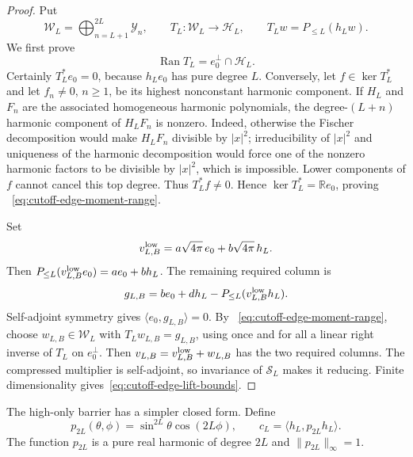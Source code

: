 \documentclass[11pt]{article}
\theoremstyle{definition}
\theoremstyle{remark}
\begin{document}
\begin{proof}
Put
\begin{equation}
 \mathcal W_L=\bigoplus_{n=L+1}^{2L}\mathcal Y_n,
 \qquad
 T_L:\mathcal W_L\longrightarrow\mathcal H_L,
 \qquad T_Lw=P_{\leq L}(h_Lw).
 \label{eq:cutoff-edge-moment-map}
\end{equation}
We first prove
\begin{equation}
 \operatorname{Ran}T_L=e_0^\perp\cap\mathcal H_L.
 \label{eq:cutoff-edge-moment-range}
\end{equation}
Certainly $T_L^*e_0=0$, because $h_Le_0$ has pure degree $L$.  Conversely,
let $f\in\ker T_L^*$ and let $f_n\neq0$, $n\geq1$, be its highest nonconstant
harmonic component.  If $H_L$ and $F_n$ are the associated homogeneous
harmonic polynomials, the degree-$(L+n)$ harmonic component of $H_LF_n$ is
nonzero.  Indeed, otherwise the Fischer decomposition would make $H_LF_n$
divisible by $|x|^2$; irreducibility of $|x|^2$ and uniqueness of the harmonic
decomposition would force one of the nonzero harmonic factors to be divisible
by $|x|^2$, which is impossible.  Lower components of $f$ cannot cancel this
top degree.  Thus $T_L^*f\neq0$.  Hence $\ker T_L^*=\mathbb Re_0$, proving
~\eqref{eq:cutoff-edge-moment-range}.

Set
\begin{equation}
 v^{\rm low}_{L,B}=a\sqrt{4\pi}\,e_0+b\sqrt{4\pi}\,h_L.
\end{equation}
Then
$P_{\leq L}(v^{\rm low}_{L,B}e_0)=ae_0+bh_L$.  The remaining required column
is
\begin{equation}
 g_{L,B}=be_0+dh_L-P_{\leq L}(v^{\rm low}_{L,B}h_L).
 \label{eq:cutoff-edge-compatible-rhs}
\end{equation}
Self-adjoint symmetry gives $\langle e_0,g_{L,B}\rangle=0$.  By
~\eqref{eq:cutoff-edge-moment-range}, choose $w_{L,B}\in\mathcal W_L$ with
$T_Lw_{L,B}=g_{L,B}$, using once and for all a linear right inverse of $T_L$
on $e_0^\perp$.  Then
$v_{L,B}=v^{\rm low}_{L,B}+w_{L,B}$ has the two required columns.  The
compressed multiplier is self-adjoint, so invariance of $\mathcal S_L$ makes
it reducing.  Finite dimensionality gives~\eqref{eq:cutoff-edge-lift-bounds}.
\end{proof}

The high-only barrier has a simpler closed form.  Define
\begin{equation}
 p_{2L}(\theta,\phi)=\sin^{2L}\theta\cos(2L\phi),
 \qquad
 c_L=\langle h_L,p_{2L}h_L\rangle.
 \label{eq:cutoff-edge-barrier-harmonic}
\end{equation}
The function $p_{2L}$ is a pure real harmonic of degree $2L$ and
$\|p_{2L}\|_\infty=1$.
\end{document}
